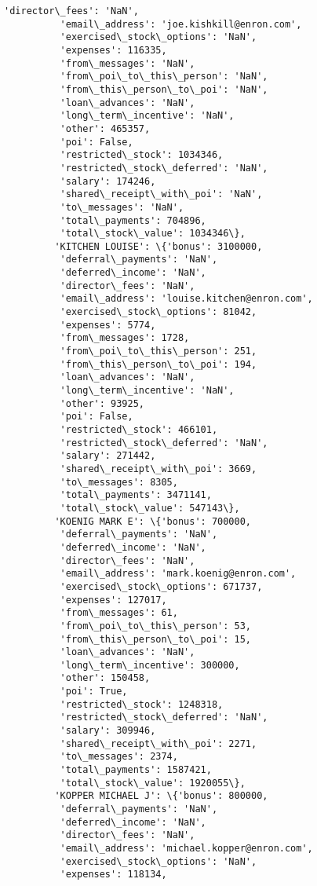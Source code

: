\documentclass[11pt]{article}
\begin{document}
\begin{Verbatim}[commandchars=\\\{\}]
          'director\_fees': 'NaN',
          'email\_address': 'joe.kishkill@enron.com',
          'exercised\_stock\_options': 'NaN',
          'expenses': 116335,
          'from\_messages': 'NaN',
          'from\_poi\_to\_this\_person': 'NaN',
          'from\_this\_person\_to\_poi': 'NaN',
          'loan\_advances': 'NaN',
          'long\_term\_incentive': 'NaN',
          'other': 465357,
          'poi': False,
          'restricted\_stock': 1034346,
          'restricted\_stock\_deferred': 'NaN',
          'salary': 174246,
          'shared\_receipt\_with\_poi': 'NaN',
          'to\_messages': 'NaN',
          'total\_payments': 704896,
          'total\_stock\_value': 1034346\},
         'KITCHEN LOUISE': \{'bonus': 3100000,
          'deferral\_payments': 'NaN',
          'deferred\_income': 'NaN',
          'director\_fees': 'NaN',
          'email\_address': 'louise.kitchen@enron.com',
          'exercised\_stock\_options': 81042,
          'expenses': 5774,
          'from\_messages': 1728,
          'from\_poi\_to\_this\_person': 251,
          'from\_this\_person\_to\_poi': 194,
          'loan\_advances': 'NaN',
          'long\_term\_incentive': 'NaN',
          'other': 93925,
          'poi': False,
          'restricted\_stock': 466101,
          'restricted\_stock\_deferred': 'NaN',
          'salary': 271442,
          'shared\_receipt\_with\_poi': 3669,
          'to\_messages': 8305,
          'total\_payments': 3471141,
          'total\_stock\_value': 547143\},
         'KOENIG MARK E': \{'bonus': 700000,
          'deferral\_payments': 'NaN',
          'deferred\_income': 'NaN',
          'director\_fees': 'NaN',
          'email\_address': 'mark.koenig@enron.com',
          'exercised\_stock\_options': 671737,
          'expenses': 127017,
          'from\_messages': 61,
          'from\_poi\_to\_this\_person': 53,
          'from\_this\_person\_to\_poi': 15,
          'loan\_advances': 'NaN',
          'long\_term\_incentive': 300000,
          'other': 150458,
          'poi': True,
          'restricted\_stock': 1248318,
          'restricted\_stock\_deferred': 'NaN',
          'salary': 309946,
          'shared\_receipt\_with\_poi': 2271,
          'to\_messages': 2374,
          'total\_payments': 1587421,
          'total\_stock\_value': 1920055\},
         'KOPPER MICHAEL J': \{'bonus': 800000,
          'deferral\_payments': 'NaN',
          'deferred\_income': 'NaN',
          'director\_fees': 'NaN',
          'email\_address': 'michael.kopper@enron.com',
          'exercised\_stock\_options': 'NaN',
          'expenses': 118134,

\end{Verbatim}
\end{document}
